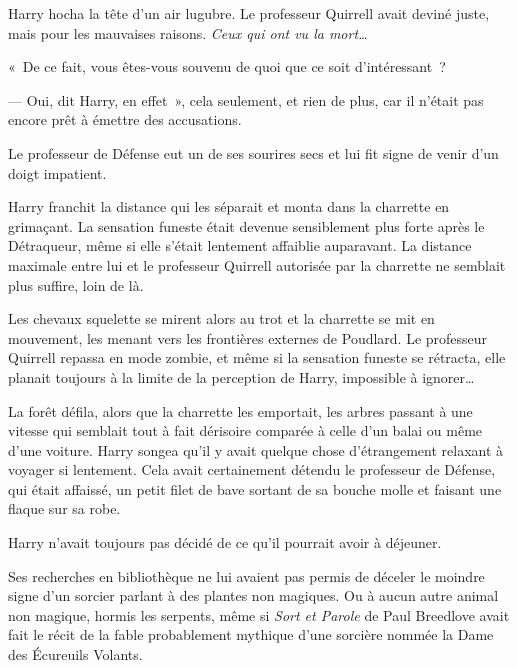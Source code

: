 Harry hocha la tête d'un air lugubre.
Le professeur Quirrell avait deviné juste, mais pour les mauvaises raisons.
\emph{Ceux qui ont vu la mort…}

«~De ce fait, vous êtes-vous souvenu de quoi que ce soit d'intéressant~?

--- Oui, dit Harry, en effet~», cela seulement, et rien de plus, car il n'était pas encore prêt à émettre des accusations.

Le professeur de Défense eut un de ses sourires secs et lui fit signe de venir d'un doigt impatient.

Harry franchit la distance qui les séparait et monta dans la charrette en grimaçant.
La sensation funeste était devenue sensiblement plus forte après le Détraqueur, même si elle s'était lentement affaiblie auparavant.
La distance maximale entre lui et le professeur Quirrell autorisée par la charrette ne semblait plus suffire, loin de là.

Les chevaux squelette se mirent alors au trot et la charrette se mit en mouvement, les menant vers les frontières externes de Poudlard.
Le professeur Quirrell repassa en mode zombie, et même si la sensation funeste se rétracta, elle planait toujours à la limite de la perception de Harry, impossible à ignorer…

La forêt défila, alors que la charrette les emportait, les arbres passant à une vitesse qui semblait tout à fait dérisoire comparée à celle d'un balai ou même d'une voiture.
Harry songea qu'il y avait quelque chose d'étrangement relaxant à voyager si lentement.
Cela avait certainement détendu le professeur de Défense, qui était affaissé, un petit filet de bave sortant de sa bouche molle et faisant une flaque sur sa robe.

Harry n'avait toujours pas décidé de ce qu'il pourrait avoir à déjeuner.

Ses recherches en bibliothèque ne lui avaient pas permis de déceler le moindre signe d'un sorcier parlant à des plantes non magiques.
Ou à aucun autre animal non magique, hormis les serpents, même si \emph{Sort et Parole} de Paul Breedlove avait fait le récit de la fable probablement mythique d'une sorcière nommée la Dame des Écureuils Volants.

